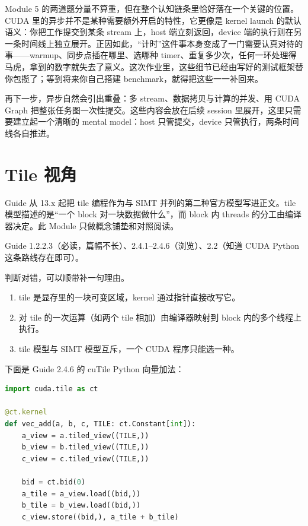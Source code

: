 \documentclass[11pt,a4paper,fontset=none]{ctexart}
\begin{document}
\begin{lookback}
Module 5 的两道题分量不算重，但在整个认知链条里恰好落在一个关键的位置。CUDA 里的异步并不是某种需要额外开启的特性，它更像是 kernel launch 的默认语义：你把工作提交到某条 stream 上，host 端立刻返回，device 端的执行则在另一条时间线上独立展开。正因如此，“计时”这件事本身变成了一门需要认真对待的事——warmup、同步点插在哪里、选哪种 timer、重复多少次，任何一环处理得马虎，拿到的数字就失去了意义。这次作业里，这些细节已经由写好的测试框架替你包揽了；等到将来你自己搭建 benchmark，就得把这些一一补回来。

再下一步，异步自然会引出重叠：多 stream、数据拷贝与计算的并发、用 CUDA Graph 把整张任务图一次性提交。这些内容会放在后续 session 里展开，这里只需要建立起一个清晰的 mental model：host 只管提交，device 只管执行，两条时间线各自推进。
\end{lookback}

\section{Tile 视角}

Guide 从 13.x 起把 tile 编程作为与 SIMT 并列的第二种官方模型写进正文。tile 模型描述的是“一个 block 对一块数据做什么”，而 block 内 threads 的分工由编译器决定。此 Module 只做概念铺垫和对照阅读。

\begin{reading}
Guide 1.2.2.3（必读，篇幅不长）、2.4.1--2.4.6（浏览）、2.2（知道 CUDA Python 这条路线存在即可）。
\end{reading}

判断对错，可以顺带补一句理由。
\begin{enumerate}[label=(\alph*)]
  \item tile 是显存里的一块可变区域，kernel 通过指针直接改写它。
  \item 对 tile 的一次运算（如两个 tile 相加）由编译器映射到 block 内的多个线程上执行。
  \item tile 模型与 SIMT 模型互斥，一个 CUDA 程序只能选一种。
\end{enumerate}

下面是 Guide 2.4.6 的 cuTile Python 向量加法：

\begin{lstlisting}[language=Python]
import cuda.tile as ct

@ct.kernel
def vec_add(a, b, c, TILE: ct.Constant[int]):
    a_view = a.tiled_view((TILE,))
    b_view = b.tiled_view((TILE,))
    c_view = c.tiled_view((TILE,))

    bid = ct.bid(0)
    a_tile = a_view.load((bid,))
    b_tile = b_view.load((bid,))
    c_view.store((bid,), a_tile + b_tile)
\end{lstlisting}
\end{document}
